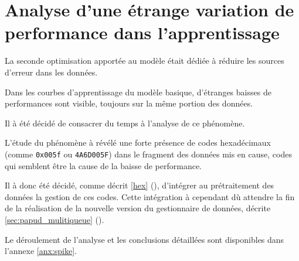 \section{Analyse d'une étrange variation de performance dans l'apprentissage} \label{sec:spike}
La seconde optimisation apportée au modèle était dédiée à réduire les sources d'erreur dans les données.

Dans les courbes d'apprentissage du modèle basique, d'étranges baisses de performances sont visible, toujours sur la même portion des données.

Il à été décidé de consacrer du temps à l'analyse de ce phénomène.

L'étude du phénomène à révélé une forte présence de codes hexadécimaux (comme \lstinline|0x005f| ou \lstinline|4A6D005F|) dans le fragment des données mis en cause, codes qui semblent être la cause de la baisse de performance.

Il à donc été décidé, comme décrit \autoref{hex} (), d'intégrer au prétraitement des données la gestion de ces codes.
Cette intégration à cependant dù attendre la fin de la réalisation de la nouvelle version du gestionnaire de données, décrite \autoref{sec:papud_mulitiqueue} ().

Le déroulement de l'analyse et les conclusions détaillées sont disponibles dans l'annexe \ref{anx:spike}.

